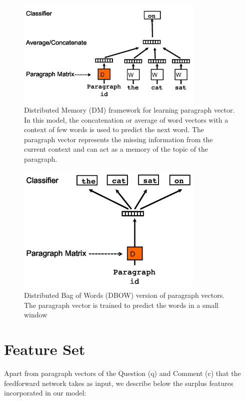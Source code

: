 \documentclass[12pt, a4paper, oneside]{Thesis} %
\begin{document}
\begin{figure}[t!]
  \centering
  \includegraphics[keepaspectratio, width=0.8\textwidth]{./Pictures/pv-dm.png}
  \caption{Distributed Memory (DM) framework for learning paragraph vector. In this model, the concatenation or average of word vectors with a context of few words is used to predict the next word. The paragraph vector represents the missing information from the current context and can act as a memory of the topic of the paragraph.}
  \label{fig:pv-dm}
\end{figure}

\begin{figure}[t!]
  \centering
  \includegraphics[keepaspectratio, width=0.8\textwidth]{./Pictures/pv-dbow.png}
  \caption{Distributed Bag of Words (DBOW) version of paragraph vectors. The paragraph vector is trained to predict the words in a small window}
  \label{fig:pv-dbow}
\end{figure}

\section{Feature Set}
\label{subsection:feature-set}

Apart from paragraph vectors of the Question (q) and Comment (c) that the feedforward network takes as input, we describe below the surplus features incorporated in our model:
\end{document}
